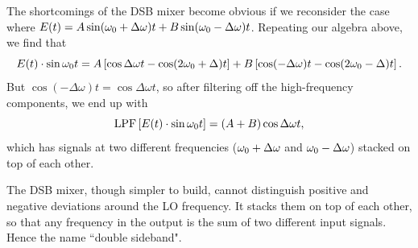 \documentclass[11pt,preprint]{aastex}
\begin{document}
The shortcomings of the DSB mixer become obvious if we reconsider the
case where $E(t)=A\sin(\omega_0 +\Delta\omega)t + B\sin(\omega_0 -\Delta\omega)t$.
Repeating our algebra above, we find that
\begin{equation}
E(t)\cdot \sin\omega_0 t = 
A\left[\cos\Delta\omega t - \cos(2\omega_0 +\Delta)t\right] +
B\left[\cos(-\Delta\omega) t - \cos(2\omega_0 -\Delta)t\right].
\end{equation}
But $\cos(-\Delta\omega)t=\cos\Delta\omega t$, so after filtering off the high-frequency components,
we end up with
\begin{equation}
{\rm LPF}\left[E(t)\cdot \sin\omega_0 t\right] = (A+B)\cos\Delta\omega t,
\end{equation}
which has signals at two different frequencies 
($\omega_0 +\Delta\omega$ and $\omega_0 -\Delta\omega$)
stacked on top of each other.

The DSB mixer, though simpler to build, cannot distinguish positive and negative deviations around
the LO frequency.  It stacks them on top of each other, so that any frequency in the output is the sum of two different input signals.  Hence the name ``double sideband".
\end{document}
